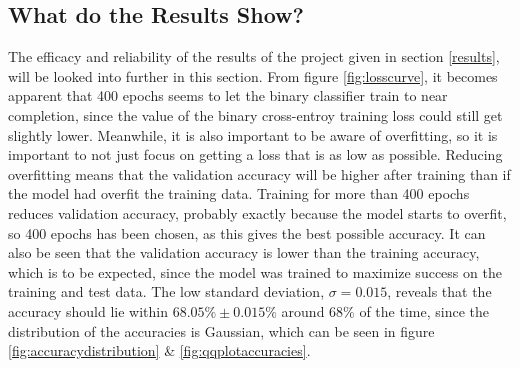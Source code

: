 \documentclass[11pt, fleqn, titlepage]{article}
\begin{document}
	\subsection{What do the Results Show?}\label{discussionOfResults}
	The efficacy and reliability of the results of the project given in section \ref{results}, will be looked into further in this section. From figure \ref{fig:losscurve}, it becomes apparent that 400 epochs seems to let the binary classifier train to near completion, since the value of the binary cross-entroy training loss could still get slightly lower. Meanwhile, it is also important to be aware of overfitting, so it is important to not just focus on getting a loss that is as low as possible. Reducing overfitting means that the validation accuracy will be higher after training than if the model had overfit the training data. Training for more than 400 epochs reduces validation accuracy, probably exactly because the model starts to overfit, so 400 epochs has been chosen, as this gives the best possible accuracy. It can also be seen that the validation accuracy is lower than the training accuracy, which is to be expected, since the model was trained to maximize success on the training and test data. The low standard deviation, $ \sigma=0.015 $, reveals that the accuracy should lie within $68.05\% \pm 0.015\%$ around $68\%$ of the time, since the distribution of the accuracies is Gaussian, which can be seen in figure \ref{fig:accuracydistribution} \& \ref{fig:qqplotaccuracies}.
	
\end{document}
